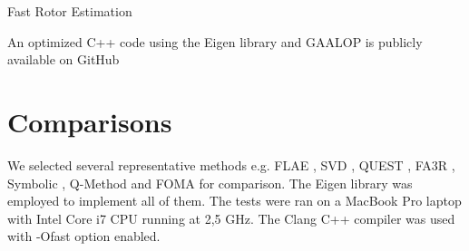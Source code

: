 \documentclass{birkjour}
\numberwithin{equation}{section}
\begin{document}
\begin{algorithm}
\begin{algorithmic}[1]
\ENDFOR
{}

\REPEAT
{}
\end{algorithmic}
\caption{Fast Rotor Estimation}\label{alg:FastRotorEstimation}
\end{algorithm}
An optimized C++ code using the Eigen library \cite{Eigen} and GAALOP  \cite{Gaalop} is publicly available on GitHub \cite{GARotorEstimator}

\section{Comparisons}

We selected several representative methods e.g. FLAE \cite{Wu2017}, SVD \cite{Arun1987}, QUEST \cite{Shuster1981}, FA3R \cite{Wu2018FA3R}, Symbolic \cite{Wu2018FS3R}, Q-Method \cite{Shuster1981} and FOMA \cite{Markley1993} for comparison. The Eigen library \cite{Eigen} was employed to implement all of them. The tests were ran on a MacBook Pro laptop with Intel Core i7 CPU running at 2,5 GHz. The Clang C++ compiler was used with -Ofast option enabled.
\end{document}
